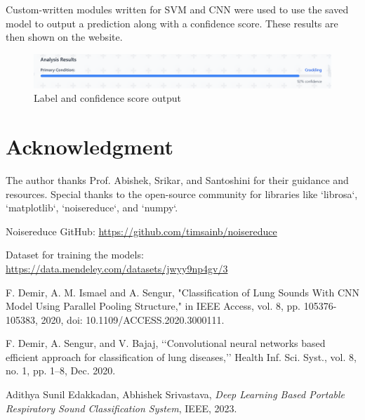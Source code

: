 \documentclass[conference]{IEEEtran}
\begin{document}
{	Custom-written modules written for SVM and CNN were used to use the saved model to output a prediction along with a confidence score. These results are then shown on the website.
	
	\begin{figure}[h]
		\centering
		\includegraphics[width=1\linewidth]{Images/website_output.png}
		\caption{Label and confidence score output}
		\label{fig:enter-label}
	\end{figure}







\section*{Acknowledgment}
The author thanks Prof. Abishek, Srikar, and Santoshini for their guidance and resources. Special thanks to the open-source community for libraries like `librosa`, `matplotlib`, `noisereduce`, and `numpy`.

\begin{thebibliography}{1}

Noisereduce GitHub: \url{https://github.com/timsainb/noisereduce}

Dataset for training the models: 
\url{https://data.mendeley.com/datasets/jwyy9np4gv/3}

F. Demir, A. M. Ismael and A. Sengur, "Classification of Lung Sounds With CNN Model Using Parallel Pooling Structure," in IEEE Access, vol. 8, pp. 105376-105383, 2020, doi: 10.1109/ACCESS.2020.3000111.

F. Demir, A. Sengur, and V. Bajaj, ‘‘Convolutional neural networks based
efficient approach for classification of lung diseases,’’ Health Inf. Sci. Syst.,
vol. 8, no. 1, pp. 1–8, Dec. 2020.

Adithya Sunil Edakkadan, Abhishek Srivastava, \textit{Deep Learning Based Portable Respiratory Sound Classification System}, IEEE, 2023.



\end{thebibliography}










}
\end{document}
